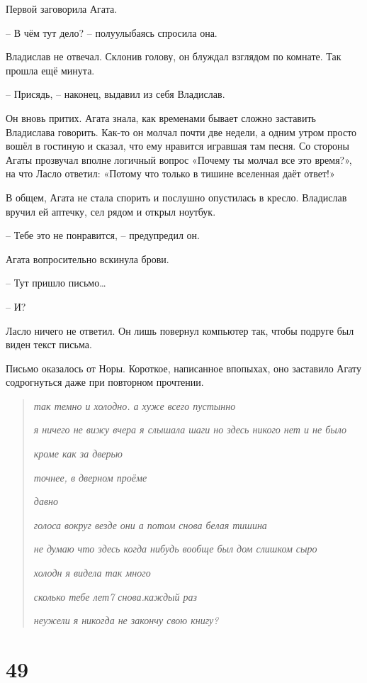\documentclass[
  a5paperpaper,
  DIV=11,
  numbers=noendperiod]{scrreprt}
\begin{document}
Первой заговорила Агата.

-- В чём тут дело? -- полуулыбаясь спросила она.

Владислав не отвечал. Склонив голову, он блуждал взглядом по комнате.
Так прошла ещё минута.

-- Присядь, -- наконец, выдавил из себя Владислав.

Он вновь притих. Агата знала, как временами бывает сложно заставить
Владислава говорить. Как-то он молчал почти две недели, а одним утром
просто вошёл в гостиную и сказал, что ему нравится игравшая там песня.
Со стороны Агаты прозвучал вполне логичный вопрос «Почему ты молчал все
это время?», на что Ласло ответил: «Потому что только в тишине вселенная
даёт ответ!»

В общем, Агата не стала спорить и послушно опустилась в кресло.
Владислав вручил ей аптечку, сел рядом и открыл ноутбук.

-- Тебе это не понравится, -- предупредил он.

Агата вопросительно вскинула брови.

-- Тут пришло письмо\ldots{}

-- И?

Ласло ничего не ответил. Он лишь повернул компьютер так, чтобы подруге
был виден текст письма.

Письмо оказалось от Норы. Короткое, написанное впопыхах, оно заставило
Агату содрогнуться даже при повторном прочтении.

\begin{quote}
\emph{так темно и холодно. а хуже всего пустынно}

\emph{я ничего не вижу вчера я слышала шаги но здесь никого нет и не
было}

\emph{кроме как за дверью}

\emph{точнее, в дверном проёме}

\emph{давно}

\emph{голоса вокруг везде они а потом снова белая тишина}

\emph{не думаю что здесь когда нибудь вообще был дом слишком сыро}

\emph{холодн я видела так много}

\emph{сколько тебе лет7 снова.каждый раз}

\emph{неужели я никогда не закончу свою книгу?}
\end{quote}

\section*{49}\label{49}
\end{document}

